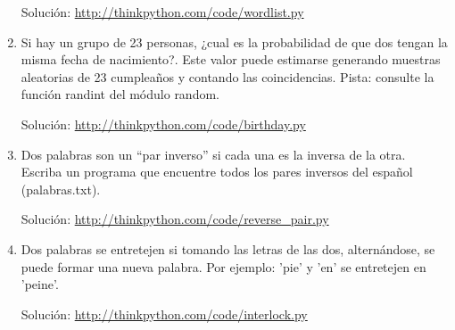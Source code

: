 \begin{enumerate}
Solución: \url{http://thinkpython.com/code/wordlist.py}
\item Si hay un grupo de 23 personas, ¿cual es la probabilidad de que dos
tengan la misma fecha de nacimiento?. Este valor puede estimarse generando
muestras aleatorias de 23 cumpleaños y contando las coincidencias.
Pista: consulte la función randint del módulo random.

Solución: \url{http://thinkpython.com/code/birthday.py}
\item Dos palabras son un ``par inverso'' si cada una es la inversa de
la otra. Escriba un programa que encuentre todos los pares inversos
del español (palabras.txt).

Solución: \url{http://thinkpython.com/code/reverse_pair.py}
\item Dos palabras se entretejen si tomando las letras de las dos, alternándose,
se puede formar una nueva palabra. Por ejemplo: 'pie' y 'en' se entretejen
en 'peine'.

Solución: \url{http://thinkpython.com/code/interlock.py} 
\end{enumerate}

